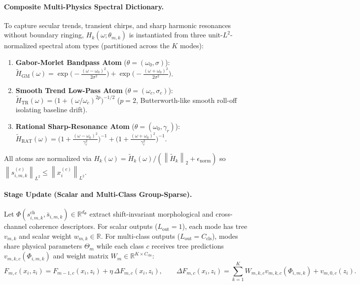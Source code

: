 \documentclass[11pt]{article}
\newcommand{\R}{\mathbb{R}}
\newcommand{\norm}[1]{\left\lVert #1 \right\rVert}
\begin{document}
\paragraph{Composite Multi-Physics Spectral Dictionary.}
To capture secular trends, transient chirps, and sharp harmonic resonances without boundary ringing, $H_k(\omega; \theta_{m,k})$ is instantiated from three unit-$L^2$-normalized spectral atom types (partitioned across the $K$ modes):
\begin{enumerate}
    \item \textbf{Gabor-Morlet Bandpass Atom} ($\theta = (\omega_0, \sigma)$): $\tilde{H}_{\mathrm{GM}}(\omega) = \exp\!\big(-\frac{(\omega - \omega_0)^2}{2\sigma^2}\big) + \exp\!\big(-\frac{(\omega + \omega_0)^2}{2\sigma^2}\big)$.
    \item \textbf{Smooth Trend Low-Pass Atom} ($\theta = (\omega_c, \sigma_c)$): $\tilde{H}_{\mathrm{TR}}(\omega) = \big(1 + (\omega / \omega_c)^{2p}\big)^{-1/2}$ ($p=2$, Butterworth-like smooth roll-off isolating baseline drift).
    \item \textbf{Rational Sharp-Resonance Atom} ($\theta = (\omega_0, \gamma_r)$): $\tilde{H}_{\mathrm{RAT}}(\omega) = \big(1 + \frac{(\omega - \omega_0)^2}{\gamma_r^2}\big)^{-1} + \big(1 + \frac{(\omega + \omega_0)^2}{\gamma_r^2}\big)^{-1}$.
\end{enumerate}
All atoms are normalized via $H_k(\omega) = \tilde{H}_k(\omega) / (\norm{\tilde{H}_k}_2 + \epsilon_{\mathrm{norm}})$ so $\norm{s_{i,m,k}^{(c)}}_{L^2} \le \norm{x_i^{(c)}}_{L^2}$.

\paragraph{Stage Update (Scalar and Multi-Class Group-Sparse).}
Let $\Phi(s_{i,m,k}^{\mathrm{ch}}, \bar{s}_{i,m,k}) \in \R^{d_\Phi}$ extract shift-invariant morphological and cross-channel coherence descriptors. For scalar outputs ($L_{\mathrm{out}}=1$), each mode has tree $v_{m,k}$ and scalar weight $w_{m,k} \in \R$. For multi-class outputs ($L_{\mathrm{out}} = C_{\mathrm{cls}}$), modes share physical parameters $\Theta_m$ while each class $c$ receives tree predictions $v_{m,k,c}(\Phi_{i,m,k})$ and weight matrix $W_m \in \R^{K \times C_{\mathrm{cls}}}$:
\begin{equation}
    F_{m,c}(x_i, z_i) = F_{m-1,c}(x_i, z_i) + \eta\,\Delta F_{m,c}(x_i, z_i), \qquad \Delta F_{m,c}(x_i, z_i) = \sum_{k=1}^K W_{m,k,c} v_{m,k,c}(\Phi_{i,m,k}) + v_{m,0,c}(z_i).
    \label{eq:update}
\end{equation}
\end{document}
